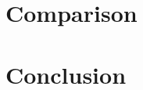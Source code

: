 \documentclass[a4paper,kul]{kulakarticle} %
\begin{document}
\section{Comparison }


\section{Conclusion}
\end{document}
